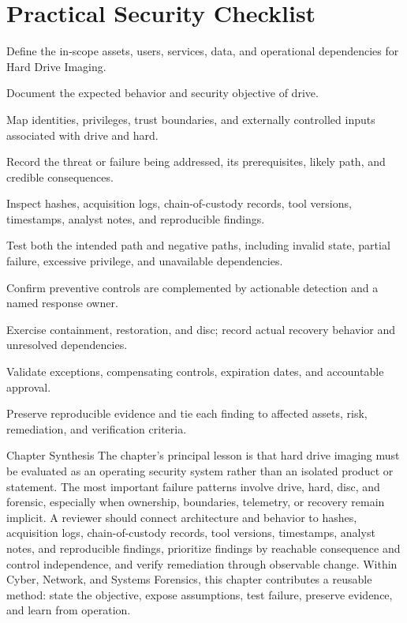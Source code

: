\documentclass[11pt,letterpaper]{article}
\begin{document}
\section*{Practical Security Checklist}
\begin{CornellChecklist}
\item Define the in-scope assets, users, services, data, and operational dependencies for Hard Drive Imaging.
\item Document the expected behavior and security objective of drive.
\item Map identities, privileges, trust boundaries, and externally controlled inputs associated with drive and hard.
\item Record the threat or failure being addressed, its prerequisites, likely path, and credible consequences.
\item Inspect hashes, acquisition logs, chain-of-custody records, tool versions, timestamps, analyst notes, and reproducible findings.
\item Test both the intended path and negative paths, including invalid state, partial failure, excessive privilege, and unavailable dependencies.
\item Confirm preventive controls are complemented by actionable detection and a named response owner.
\item Exercise containment, restoration, and disc; record actual recovery behavior and unresolved dependencies.
\item Validate exceptions, compensating controls, expiration dates, and accountable approval.
\item Preserve reproducible evidence and tie each finding to affected assets, risk, remediation, and verification criteria.
\end{CornellChecklist}
\begin{CornellSummaryBox}{Chapter Synthesis}
The chapter's principal lesson is that hard drive imaging must be evaluated as an operating security system rather than an isolated product or statement. The most important failure patterns involve drive, hard, disc, and forensic, especially when ownership, boundaries, telemetry, or recovery remain implicit. A reviewer should connect architecture and behavior to hashes, acquisition logs, chain-of-custody records, tool versions, timestamps, analyst notes, and reproducible findings, prioritize findings by reachable consequence and control independence, and verify remediation through observable change. Within Cyber, Network, and Systems Forensics, this chapter contributes a reusable method: state the objective, expose assumptions, test failure, preserve evidence, and learn from operation.
\end{CornellSummaryBox}
\end{document}
